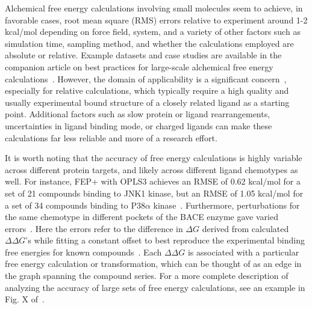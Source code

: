 \documentclass[9pt,bestpractices]{livecoms}
\begin{document}
Alchemical free energy calculations involving small molecules seem to achieve, in favorable cases, root mean square (RMS) errors relative to experiment around 1-2 kcal/mol depending on force field, system, and a variety of other factors such as simulation time, sampling method, and whether the calculations employed are absolute or relative. Example datasets and case studies are available in the companion article on best practices for large-scale alchemical free energy calculations~\cite{mey_largescale_inprep}.
However, the domain of applicability is a significant concern~\cite{sherborne2016collaborating, cournia2017relative}, especially for relative calculations, which typically require a high quality and usually experimental bound structure of a closely
related ligand as a starting point. Additional factors such as slow protein or ligand rearrangements, uncertainties in ligand binding mode, or charged ligands can make these calculations far less reliable and more of a research effort.

It is worth noting that the accuracy of free energy calculations is highly variable across different protein targets, and likely across different ligand chemotypes as well.
For instance, FEP+ with OPLS3 achieves an RMSE of 0.62 kcal/mol for a set of 21 compounds binding to JNK1 kinase, but an RMSE of 1.05 kcal/mol for a set of 34 compounds binding to P38$\alpha$ kinase~\cite{harder2016opls3}.
Furthermore, perturbations for the same chemotype in different pockets of the BACE enzyme gave varied errors~\cite{keranen2017acylguanidine}. Here the errors refer to the difference in $\Delta G$ derived from calculated $\Delta \Delta G$'s while fitting a constant offset to best reproduce the experimental binding free energies for known compounds~\cite{wang2015accurate}. Each $\Delta \Delta G$ is associated with a particular free energy calculation or transformation, which can be thought of as an edge in the graph spanning the compound series.  For a more complete description of analyzing the accuracy of large sets of free energy calculations, see an example in Fig. X of~\cite{mey_largescale_inprep}.
\end{document}
